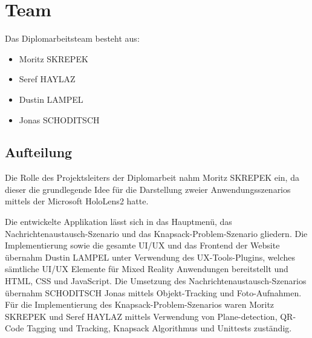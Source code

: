 \section{Team}
Das Diplomarbeitsteam besteht aus:
\begin{itemize}
    \item Moritz SKREPEK
    \item Seref HAYLAZ
    \item Dustin LAMPEL
    \item Jonas SCHODITSCH
\end{itemize}

\subsection{Aufteilung}
Die Rolle des Projektsleiters der Diplomarbeit nahm Moritz SKREPEK ein, da dieser die grundlegende Idee für die Darstellung
zweier Anwendungsszenarios mittels der Microsoft HoloLens2 hatte.

Die entwickelte Applikation lässt sich in das Hauptmenü, das Nachrichtenaustausch-Szenario und das Knapsack-Problem-Szenario
gliedern. Die Implementierung sowie die gesamte UI/UX und das Frontend der Website übernahm Dustin LAMPEL unter Verwendung
des UX-Tools-Plugins, welches sämtliche UI/UX Elemente für Mixed Reality Anwendungen bereitstellt und HTML, CSS und JavaScript.
Die Umsetzung des Nachrichtenaustausch-Szenarios übernahm SCHODITSCH Jonas mittels Objekt-Tracking und Foto-Aufnahmen. Für
die Implementierung des Knapsack-Problem-Szenarios waren Moritz SKREPEK und Seref HAYLAZ mittels Verwendung von Plane-detection,
QR-Code Tagging und Tracking, Knapsack Algorithmus und Unittests zuständig.



